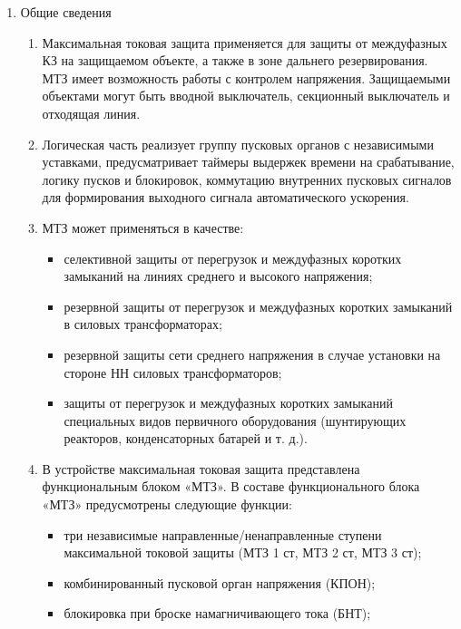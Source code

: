 
\color{black}

\begin{enumerate}

\item Общие сведения

\begin{enumerate}

\item
Максимальная токовая защита применяется для защиты от междуфазных КЗ на защищаемом объекте, а также в зоне дальнего резервирования. МТЗ имеет возможность работы с контролем напряжения. Защищаемыми объектами могут быть вводной выключатель, секционный выключатель и отходящая линия.

\item
Логическая часть реализует группу пусковых органов с независимыми уставками, предусматривает таймеры выдержек времени на срабатывание, логику пусков и блокировок, коммутацию внутренних пусковых сигналов для формирования выходного сигнала автоматического ускорения.

\item
МТЗ может применяться в качестве:
\begin{itemize}
    \item селективной защиты от перегрузок и междуфазных коротких замыканий на линиях среднего и высокого напряжения;
    \item резервной защиты от перегрузок и междуфазных коротких замыканий в силовых трансформаторах;
    \item резервной защиты сети среднего напряжения в случае установки на стороне НН силовых трансформаторов;
    \item защиты от перегрузок и междуфазных  коротких замыканий специальных видов первичного оборудования (шунтирующих реакторов, конденсаторных батарей и т. д.).
\end{itemize}

\item
В устройстве максимальная токовая защита представлена функциональным блоком «МТЗ». В составе функционального блока «МТЗ» предусмотрены следующие функции:
\begin{itemize}
\item три независимые направленные/ненаправленные ступени максимальной токовой защиты (МТЗ 1 ст, МТЗ 2 ст, МТЗ 3 ст);
\item комбинированный пусковой орган напряжения (КПОН);
\item блокировка при броске намагничивающего тока (БНТ);


\end{itemize}
\end{enumerate}
\end{enumerate}
